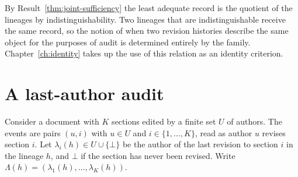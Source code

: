 By Result~\ref{thm:joint-sufficiency} the least adequate record is the quotient of the lineages by indistinguishability. Two lineages that are indistinguishable receive the same record, so the notion of when two revision histories describe the same object for the purposes of audit is determined entirely by the family. Chapter~\ref{ch:identity} takes up the use of this relation as an identity criterion.

\section{A last-author audit}

Consider a document with $K$ sections edited by a finite set $U$ of authors. The events are pairs $(u,i)$ with $u\in U$ and $i\in\{1,\dots,K\}$, read as author $u$ revises section $i$. Let $\lambda_i(h)\in U\cup\{\bot\}$ be the author of the last revision to section $i$ in the lineage $h$, and $\bot$ if the section has never been revised. Write $\Lambda(h)=(\lambda_1(h),\dots,\lambda_K(h))$.

